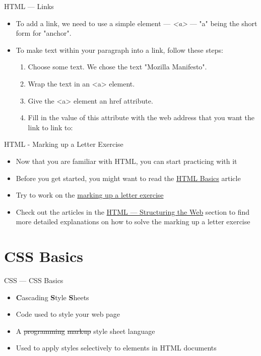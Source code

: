 \documentclass[aspectratio=169]{beamer}
\begin{document}
\begin{darkframes}
    \begin{frame}{HTML — Links}
        \begin{itemize}
            \item To add a link, we need to use a simple element — \textit{<a>} — "a" being the short form for "anchor".
            \item To make text within your paragraph into a link, follow these steps:
            \begin{enumerate}
                \item Choose some text. We chose the text "Mozilla Manifesto".
                \item Wrap the text in an <a> element.
                \item Give the <a> element an href attribute.
                \item Fill in the value of this attribute with the web address that you want the link to link to:
            \end{enumerate}
            \htmlLink
        \end{itemize}
    \end{frame}
    
    \begin{frame}{HTML - Marking up a Letter Exercise}
        \begin{itemize}
            \item Now that you are familiar with HTML, you can start practicing with it
            \item Before you get started, you might want to read the \href{https://developer.mozilla.org/en-US/docs/Learn/Getting_started_with_the_web/HTML_basics}{HTML Basics} article
            \item Try to work on the \href{https://developer.mozilla.org/en-US/docs/Learn/HTML/Introduction_to_HTML/Marking_up_a_letter}{marking up a letter exercise}
            \item Check out the articles in the \href{https://developer.mozilla.org/en-US/docs/Learn/HTML}{HTML — Structuring the Web} section to find more detailed explanations on how to solve the marking up a letter exercise
        \end{itemize}
    \end{frame}
    
    \section{CSS Basics}
    \begin{frame}{CSS — CSS Basics}
    \begin{itemize}
        \item \textbf{C}ascading \textbf{S}tyle \textbf{S}heets
        \item Code used to style your web page
        \item A \st{programming} \st{markup} style sheet language
        \item Used to apply styles selectively to elements in HTML documents
    \end{itemize}
    \end{frame}
    

\end{darkframes}
\end{document}
